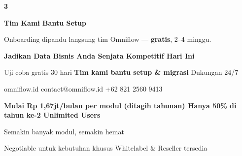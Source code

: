 \documentclass[a4paper]{article}
\begin{document}
\begin{center}
\begin{minipage}[t]{0.318\textwidth}
{\begin{minipage}[t][4.7cm][c]{\dimexpr\linewidth-2\fboxsep\relax}
            \begin{center}
                {\fontsize{22}{26}\selectfont\bfseries\color{BluePrimary} 3}
            \end{center}
            \vspace{2pt}
            \begin{center}
                {\fontsize{10}{13}\selectfont\bfseries\color{BlueDark} Tim Kami Bantu Setup}\par\vspace{3pt}
                {\fontsize{9}{12}\selectfont\color{TextDark} Onboarding dipandu langsung tim Omniflow --- \textbf{gratis}, 2--4 minggu.}
            \end{center}
        \end{minipage}}
\end{minipage}
\end{center}

\vspace{8pt}

{\setlength{\fboxsep}{10pt}\setlength{\fboxrule}{0pt}%
\noindent\colorbox{BluePrimary}{%
    \begin{minipage}{\dimexpr\textwidth-2\fboxsep\relax}
        \centering
        {\fontsize{13}{16}\selectfont\bfseries\color{White}
        Jadikan Data Bisnis Anda Senjata Kompetitif Hari Ini}\par\vspace{3pt}
        {\fontsize{9.5}{12}\selectfont\color{BlueMid}
        Uji coba gratis 30 hari \enspace\textbullet\enspace \textbf{Tim kami bantu setup \& migrasi} \enspace\textbullet\enspace Dukungan 24/7}\par\vspace{2pt}
        {\fontsize{9.5}{12}\selectfont\color{BlueLight}
        omniflow.id \enspace\textbullet\enspace contact@omniflow.id \enspace\textbullet\enspace +62 821 2560 9413}
    \end{minipage}}}


\vspace{6pt}

{\setlength{\fboxsep}{8pt}\setlength{\fboxrule}{0pt}%
\noindent\colorbox{BlueBg}{%
    \begin{minipage}{\dimexpr\textwidth-2\fboxsep\relax}
        \centering
        {\fontsize{9}{12}\selectfont\bfseries\color{BluePrimary}
        Mulai Rp 1,67jt/bulan per modul (ditagih tahunan) \enspace\textbullet\enspace Hanya 50\% di tahun ke-2 \enspace\textbullet\enspace Unlimited Users}\par\vspace{1pt}
        {\fontsize{8.5}{11}\selectfont\color{BlueDark}
        Semakin banyak modul, semakin hemat}\par\vspace{1pt}
        {\fontsize{8}{10}\selectfont\color{TextLight}
        Negotiable untuk kebutuhan khusus \enspace\textbullet\enspace Whitelabel \& Reseller tersedia}
    \end{minipage}}}

\restoregeometry
\pagestyle{empty}
\end{document}
